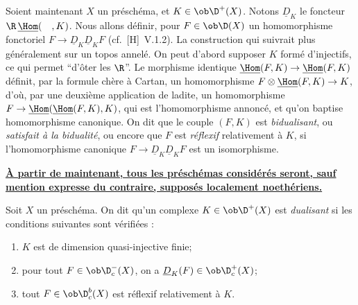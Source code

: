 Soient maintenant $X$ un préschéma, et $K \in \ob \D^{+}(X)$. Notons $\underline{D}_K$ le foncteur $\R\,\underline{\Hom}(\quad, K)$. Nous allons définir, pour $F \in \ob \D(X)$ un homomorphisme fonctoriel $F \to \underline{D}_K \underline{D}_K F$ (cf.~[H]~V.1.2). La construction qui suivrait plus généralement sur un topos annelé. On peut d'abord supposer $K$ formé d'injectifs, ce qui permet ``d'ôter les $\R$''. Le morphisme identique $\underline{\Hom}(F,K) \to \underline{\Hom}(F,K)$ définit, par la formule chère à Cartan, un homomorphisme $F \otimes \underline{\Hom}(F,K) \to K$, d'où, par une deuxième application de ladite, un homomorphisme $F \to \underline{\Hom}(\underline{\Hom}(F,K), K)$, qui est l'homomorphisme annoncé, et qu'on baptise homomorphisme canonique. On dit que le couple $(F,K)$ est \emph{bidualisant}, ou \emph{satisfait à la bidualité}, ou encore que $F$ est \emph{réflexif} relativement à $K$, si l'homomorphisme canonique $F \to \underline{D}_K \underline{D}_K F$ est un isomorphisme.

\textbf{\underline{À partir de maintenant, tous les préschémas considérés seront, sauf mention expresse du contraire, supposés localement noethériens.}}

\begin{definition}
Soit $X$ un préschéma. On dit qu'un complexe $K \in \ob \D^{+}(X)$ est \emph{dualisant} si les conditions suivantes sont vérifiées :
\begin{enumerate}
\item[(i)] $K$ est de dimension quasi-injective finie;
\item[(ii)] pour tout $F \in \ob \D_c^{-}(X)$, on a $\underline{D}_K(F) \in \ob \D_c^{+}(X)$;
\item[(iii)] tout $F \in \ob \D_c^{b}(X)$ est réflexif relativement à $K$.
\end{enumerate}
\end{definition}


